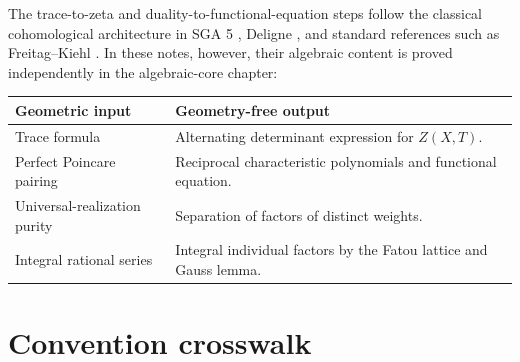 The trace-to-zeta and duality-to-functional-equation steps follow the
classical cohomological architecture in SGA 5 \cite{SGA5}, Deligne
\cite{DeligneWeilI,DeligneWeilII}, and standard references such as
Freitag--Kiehl \cite{FreitagKiehl}.  In these notes, however, their algebraic
content is proved independently in the algebraic-core chapter:

\begin{center}
\begin{tabularx}{0.94\textwidth}{>{\raggedright\arraybackslash}p{}X}
\toprule
Geometric input & Geometry-free output\\
\midrule
Trace formula &
Alternating determinant expression for \(Z(X,T)\).\\
Perfect Poincare pairing &
Reciprocal characteristic polynomials and functional equation.\\
Universal-realization purity &
Separation of factors of distinct weights.\\
Integral rational series &
Integral individual factors by the Fatou lattice and Gauss lemma.\\
\bottomrule
\end{tabularx}
\end{center}

\section{Convention crosswalk}

